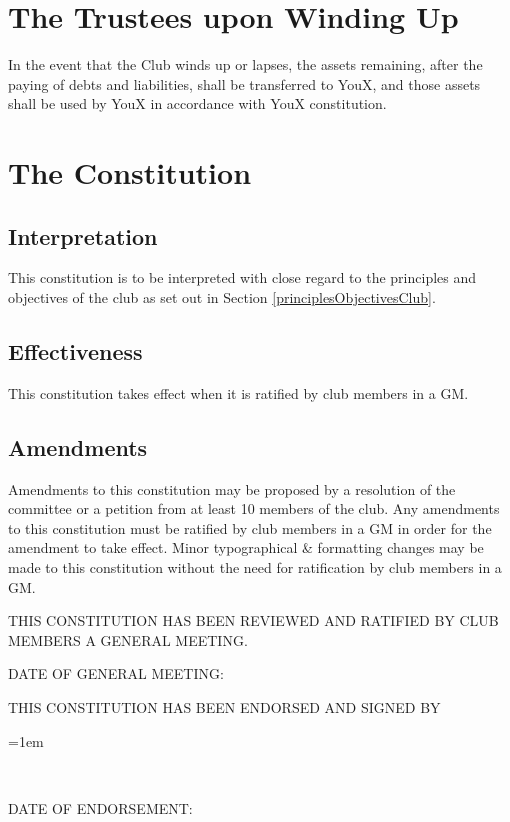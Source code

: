 \documentclass[11pt]{article}
\newcommand{\signature}[2]{%
    \hsize=6cm%
    \parindent=1em%
    \vspace*{2em}%
    \begingroup%
    \par\noindent\makebox[\hsize]{\hrulefill}%
    \par\noindent\makebox[\hsize][l]{\indent #1}%
    \\ \noindent\makebox[\hsize][l]{\indent #2}%
    \endgroup%
}
\begin{document}
\section{The Trustees upon Winding Up}
In the event that the Club winds up or lapses, the assets remaining, after the paying of debts and liabilities, shall be transferred to YouX, and those assets shall be used by YouX in accordance with YouX constitution.

\section{The Constitution}
\subsection{Interpretation}
This constitution is to be interpreted with close regard to the principles and objectives of the club as set out in Section \ref{principlesObjectivesClub}.
\subsection{Effectiveness}
This constitution takes effect when it is ratified by club members in a GM.
\subsection{Amendments}
Amendments to this constitution may be proposed by a resolution of the committee or a petition from at least 10 members of the club. Any amendments to this constitution must be ratified by club members in a GM in order for the amendment to take effect. Minor typographical \& formatting changes may be made to this constitution without the need for ratification by club members in a GM.

\setlength{\parindent}{0pt}
\vfill
THIS CONSTITUTION HAS BEEN REVIEWED AND RATIFIED BY CLUB MEMBERS A GENERAL MEETING.

\vspace{0.5cm}
DATE OF GENERAL MEETING:\framebox[5cm]{\rule{0pt}{10pt}}

\vspace{1cm}
THIS CONSTITUTION HAS BEEN ENDORSED AND SIGNED BY
\vspace{1cm}


\signature{INSERT NAME}{INSERT TITLE}

\vspace{0.5cm}
DATE OF ENDORSEMENT: \framebox[5cm]{\rule{0pt}{10pt}}
\end{document}
